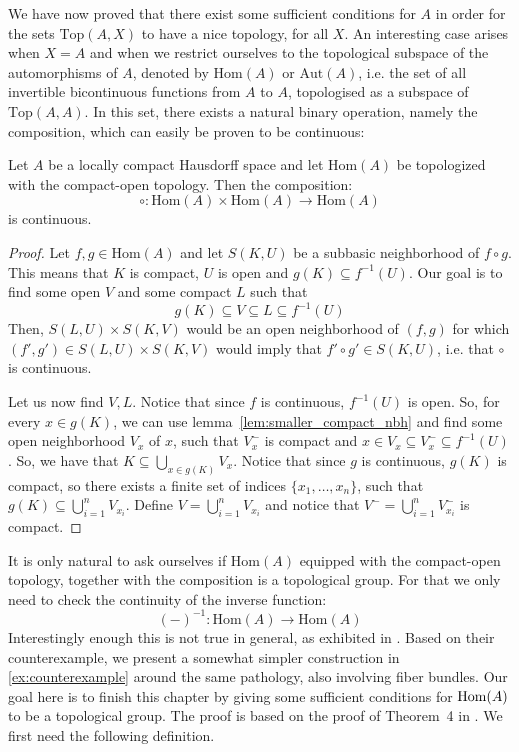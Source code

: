We have now proved that there exist some sufficient conditions for $A$ in order for the sets $\mathrm{Top}(A,X)$ to have a nice topology, for all $X$. An interesting case arises when $X=A$ and when we restrict ourselves to the topological subspace of the automorphisms of $A$, denoted by $\mathrm{Hom}(A)$ or $\mathrm{Aut}(A)$, i.e. the set of all invertible bicontinuous functions from $A$ to $A$, topologised as a subspace of $\mathrm{Top}(A,A)$. In this set, there exists a natural binary operation, namely the composition, which can easily be proven to be continuous:
\begin{proposition} Let $A$ be a locally compact Hausdorff space and let $\mathrm{Hom}(A)$ be topologized with the compact-open topology. Then the composition:
\[\circ:\mathrm{Hom}(A)\times\mathrm{Hom}(A)\to\mathrm{Hom}(A)\]
is continuous.
\end{proposition}
\begin{proof} Let $f,g\in\mathrm{Hom}(A)$ and let $S(K,U)$ be a subbasic neighborhood of $f\circ g$. This means that $K$ is compact, $U$ is open and $g(K)\subseteq f^{-1}(U)$. Our goal is to find some open $V$ and some compact $L$ such that
\[g(K)\subseteq V\subseteq L\subseteq f^{-1}(U)\]
Then, $S(L,U)\times S(K,V)$ would be an open neighborhood of $(f,g)$ for which $(f',g')\in S(L,U)\times S(K,V)$ would imply that $f'\circ g'\in S(K,U)$, i.e. that $\circ$ is continuous.

Let us now find $V,L$. Notice that since $f$ is continuous, $f^{-1}(U)$ is open. So, for every $x\in g(K)$, we can use lemma~\ref{lem:smaller_compact_nbh} and find some open neighborhood $V_x$ of $x$, such that $V_x^-$ is compact and $x\in V_x\subseteq V_x^-\subseteq f^{-1}(U)$. So, we have that $K\subseteq\bigcup_{x\in g(K)}V_x$. Notice that since $g$ is continuous, $g(K)$ is compact, so there exists a finite set of indices $\{x_1,\ldots,x_n\}$, such that $g(K)\subseteq\bigcup_{i=1}^nV_{x_i}$. Define $V=\bigcup_{i=1}^nV_{x_i}$ and notice that $V^-=\bigcup_{i=1}^nV_{x_i}^-$ is compact.
\end{proof}



It is only natural to ask ourselves if $\mathrm{Hom}(A)$ equipped with the compact-open topology, together with the composition is a topological group. For that we only need to check the continuity of the inverse function:
\[(-)^{-1}:\mathrm{Hom}(A)\to\mathrm{Hom}(A)\]
Interestingly enough this is not true in general, as exhibited in \cite{counterexample}. Based on their counterexample, we present a somewhat simpler construction in \ref{ex:counterexample} around the same pathology, also involving fiber bundles. Our goal here is to finish this chapter by giving some sufficient conditions for $\mathrm{Hom}(A)$ to be a topological group. The proof is based on the proof of Theorem~4 in \cite{top_group}. We first need the following definition.

